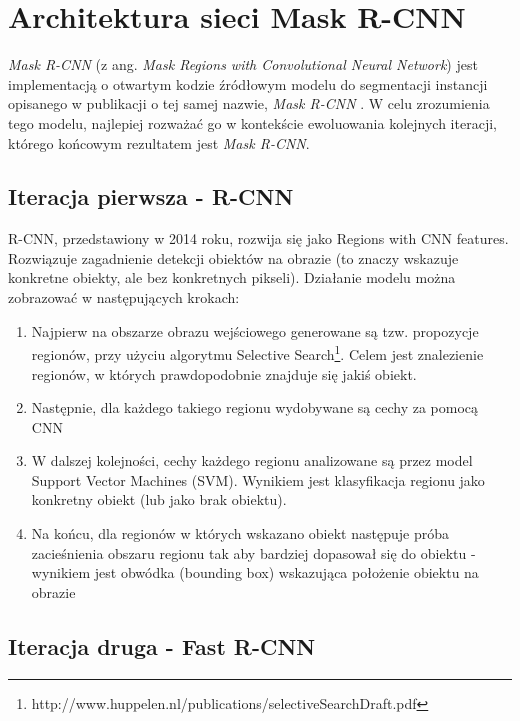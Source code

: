 \section{Architektura sieci Mask R-CNN}
\label{sec:architekrura_mask_rcnn}

\textit{Mask R-CNN} (z ang. \textit{Mask Regions with Convolutional Neural Network}) \cite{matterport-mask-rcnn} jest implementacją o otwartym kodzie źródłowym modelu do segmentacji instancji opisanego w publikacji o tej samej nazwie, \textit{Mask R-CNN} \cite{general-mask-rcnn}.
W celu zrozumienia tego modelu, najlepiej rozważać go w kontekście ewoluowania kolejnych iteracji, którego końcowym rezultatem jest \textit{Mask R-CNN}.

\subsection{Iteracja pierwsza - R-CNN}


R-CNN, przedstawiony w 2014 roku, rozwija się jako Regions with CNN features.
Rozwiązuje zagadnienie detekcji obiektów na obrazie (to znaczy wskazuje konkretne obiekty, ale bez konkretnych pikseli).
Działanie modelu można zobrazować w następujących krokach:

\begin{enumerate}
  \item Najpierw na obszarze obrazu wejściowego generowane są tzw. propozycje regionów, przy użyciu algorytmu Selective Search\footnote{http://www.huppelen.nl/publications/selectiveSearchDraft.pdf}.
        Celem jest znalezienie regionów, w których prawdopodobnie znajduje się jakiś obiekt.
	\item Następnie, dla każdego takiego regionu wydobywane są cechy za pomocą CNN
  \item W dalszej kolejności, cechy każdego regionu analizowane są przez model Support Vector Machines (SVM).
        Wynikiem jest klasyfikacja regionu jako konkretny obiekt (lub jako brak obiektu).
	\item Na końcu, dla regionów w których wskazano obiekt następuje próba zacieśnienia obszaru regionu tak aby bardziej dopasował się do obiektu - wynikiem jest obwódka (bounding box) wskazująca położenie obiektu na obrazie
\end{enumerate}

\subsection{Iteracja druga - Fast R-CNN}

